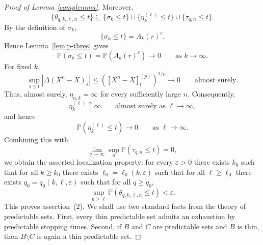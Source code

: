 \documentclass[a4paper,10pt]{article}
\begin{document}
\begin{proof}[Proof of Lemma \ref{complemma}]
Moreover,
\[
\{\theta_{q,k,\ell,n}\le t\}
\subseteq
\{\sigma_k\le t\}
\cup
\{\eta_k^{(\ell)}\le t\}
\cup
\{\tau_{q,n}\le t\}.
\]
By the definition of \(\sigma_k\),
\[
        \{\sigma_k\le t\}=A_k(r)^c.
\]
Hence Lemma~\ref{lem:p-thres} gives
\[
        \mathbb P(\sigma_k\le t)
        =
        \mathbb P(A_k(r)^c)
        \longrightarrow0
        \qquad\text{as }k\to\infty.
\]
For fixed \(k\),
\[
\sup_{s\le t}
|\Delta(X^n-X)_s|
\le
\left(
[X^n-X]^{(p)}_t
\right)^{1/p}
\longrightarrow0
\qquad\text{almost surely}.
\]
Thus, almost surely, \(\eta_{n,k}=\infty\) for every sufficiently
large \(n\). Consequently,
\[
        \eta_k^{(\ell)}\uparrow\infty
        \qquad\text{almost surely as }\ell\to\infty,
\]
and hence
\[
        \mathbb P(\eta_k^{(\ell)}\le t)\to0
        \qquad\text{as } \ell\to\infty .
\]
Combining this with
\[
        \lim_{q\to\infty}\sup_n
        \mathbb P(\tau_{q,n}\le t)=0,
\]
we obtain the asserted localization property: for every \(\varepsilon>0\)
there exists \(k_0\) such that for all \(k\ge k_0\) there exists
\(\ell_0=\ell_0(k,\varepsilon)\) such that for all \(\ell\ge\ell_0\)
there exists \(q_0=q_0(k,\ell,\varepsilon)\) such that for all \(q\ge q_0\),
\[
        \sup_{n\ge\ell}
        \mathbb P(\theta_{q,k,\ell,n}\le t)
        <\varepsilon .
\]
This proves assertion~(2).
We shall use two standard facts from the theory of predictable sets.
First, every thin predictable set admits an exhaustion by predictable
stopping times. Second, if \(B\) and \(C\) are predictable sets and
\(B\) is thin, then \(B\setminus C\) is again a thin predictable set.


\end{proof}
\end{document}
